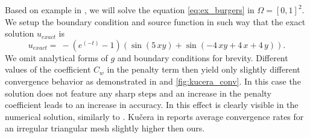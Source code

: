 \begin{example}
\label{ex:kucera}
Based on example in \cite[Section 1.6]{Kucera},
we will solve the equation \eqref{eq:ex_burgers} in $\Omega = [0, 1]^2$.
We setup the boundary condition and source function in such way that the exact
solution $u_{exact}$ is
\begin{equation}
	u_{exact} =  \ -{\left(e^{\left(-t\right)} - 1\right)} {\left(\sin\left(5 \,x
	y\right) + \sin\left(-4 \,
	x y + 4 \,x + 4 \, y\right)\right)}.
\end{equation}
We omit analytical forms of $g$ and boundary conditions for brevity.
Different values of the coefficient $C_w$ in the penalty term then yield only slightly different
convergence behavior as demonstrated in  and 
\ref{fig:kucera_conv}. In this case the solution does not feature any sharp steps and
an increase in the penalty coefficient leads to an increase in accuracy. In 
this effect is clearly visible in the numerical solution, similarly to . Kučera
in \cite{Kucera} reports average convergence rates for an irregular triangular mesh
slightly higher then ours.

\end{example}
